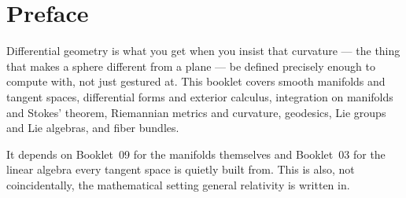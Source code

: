 \chapter*{Preface}

Differential geometry is what you get when you insist that
curvature --- the thing that makes a sphere different from a plane ---
be defined precisely enough to compute with, not just gestured at. This
booklet covers smooth manifolds and tangent spaces, differential forms
and exterior calculus, integration on manifolds and Stokes' theorem,
Riemannian metrics and curvature, geodesics, Lie groups and Lie
algebras, and fiber bundles.

It depends on Booklet~09 for the manifolds themselves and Booklet~03
for the linear algebra every tangent space is quietly built from. This
is also, not coincidentally, the mathematical setting general
relativity is written in.

